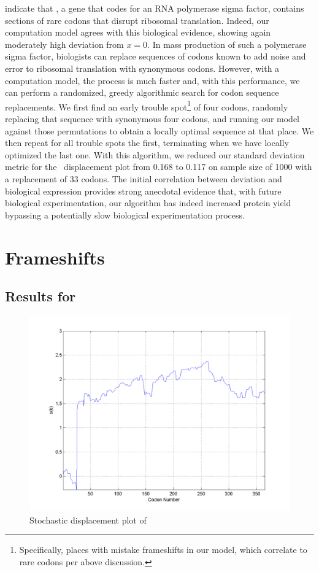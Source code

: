 \documentclass[12pt]{article}
\numberwithin{equation}{section}
\begin{document}

\citet{rpoS:process} indicate that \rpoS, a gene that codes for an RNA
polymerase sigma factor, contains sections of rare codons that disrupt
ribosomal translation. Indeed, our computation model agrees with this
biological evidence, showing again moderately high deviation from $x =
0$. In mass production of such a polymerase sigma factor, biologists
can replace sequences of codons known to add noise and error to
ribosomal translation with synonymous codons. 
However, with a computation model, the process is much
faster and, with this performance, we can perform a randomized, greedy
algorithmic search for codon sequence replacements. We first find an
early trouble spot\footnote{Specifically, places with
  mistake frameshifts in our model, which correlate to rare codons per
  above discussion.} of four codons, randomly replacing that sequence
with synonymous four codons, and running our model against those
permutations to obtain a locally optimal sequence at that place. We
then repeat for all trouble spots the first, terminating when we have locally
optimized the last one. With this algorithm, we reduced our standard
deviation metric for the \rpoS\ displacement plot from 0.168 to 0.117
on sample size of 1000 with a replacement of 33 codons. The
initial correlation between deviation and biological expression
provides strong anecdotal evidence that, with future biological
experimentation, our algorithm has indeed increased protein yield
bypassing a potentially slow biological experimentation process.

\section{Frameshifts}

\subsection{Results for \prfB}

\begin{figure}
  \centering
  \caption{Stochastic displacement plot of \prfB}
  \label{prfB}
  \includegraphics[scale=0.4]{prfB/disp}
\end{figure}
\end{document}
